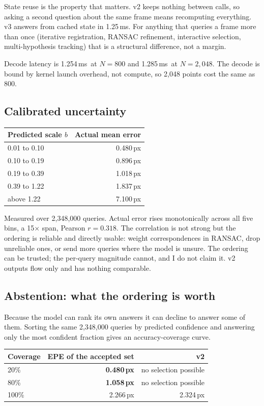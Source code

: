\documentclass[11pt,a4paper]{article}
\newcommand{\px}{\,px}
\newcommand{\ms}{\,ms}
\begin{document}
State reuse is the property that matters. v2 keeps nothing between calls, so
asking a second question about the same frame means recomputing everything. v3
answers from cached state in 1.25\ms. For anything that queries a frame more than
once (iterative registration, RANSAC refinement, interactive selection,
multi-hypothesis tracking) that is a structural difference, not a margin.

Decode latency is 1.254\ms\ at $N=800$ and 1.285\ms\ at $N=2{,}048$. The decode is
bound by kernel launch overhead, not compute, so 2{,}048 points cost the same as
800.

\subsection{Calibrated uncertainty}
\begin{center}
\small
\begin{tabular}{lr}
\toprule
Predicted scale $b$ & Actual mean error \\
\midrule
0.01 to 0.10 & 0.480\px \\
0.10 to 0.19 & 0.896\px \\
0.19 to 0.39 & 1.018\px \\
0.39 to 1.22 & 1.837\px \\
above 1.22 & 7.100\px \\
\bottomrule
\end{tabular}
\end{center}

Measured over 2{,}348{,}000 queries. Actual error rises monotonically across all
five bins, a 15$\times$ span, Pearson $r = 0.318$. The correlation is not strong
but the ordering is reliable and directly usable: weight correspondences
in RANSAC, drop unreliable ones, or send more queries where the model is unsure.
The ordering can be trusted; the per-query magnitude cannot, and I do not claim it.
v2 outputs flow only and has nothing comparable.

\subsection{Abstention: what the ordering is worth}
Because the model can rank its own answers it can decline to answer some of them.
Sorting the same 2{,}348{,}000 queries by predicted confidence and answering only
the most confident fraction gives an accuracy-coverage curve.

\begin{center}
\small
\begin{tabular}{lrr}
\toprule
Coverage & EPE of the accepted set & v2 \\
\midrule
20\% & \textbf{0.480\px} & no selection possible \\
80\% & \textbf{1.058\px} & no selection possible \\
100\% & 2.266\px & 2.324\px \\
\bottomrule
\end{tabular}
\end{center}
\end{document}
